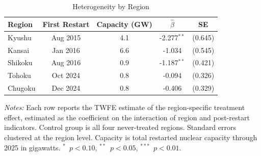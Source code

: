 \begin{table}[t]
\centering
\caption{Heterogeneity by Region}
\label{tab:hetero}
\begin{tabular}{lcccc}
\hline\hline
Region & First Restart & Capacity (GW) & $\hat{\beta}$ & SE \\
\hline
Kyushu & Aug 2015 & 4.1 & -2.277$^{**}$ & (0.645) \\
Kansai & Jan 2016 & 6.6 & -1.034 & (0.545) \\
Shikoku & Aug 2016 & 0.9 & -1.187$^{**}$ & (0.421) \\
Tohoku & Oct 2024 & 0.8 & -0.094 & (0.326) \\
Chugoku & Dec 2024 & 0.8 & -0.406 & (0.329) \\
\hline\hline
\end{tabular}
\begin{tablenotes}
\item \textit{Notes:} Each row reports the TWFE estimate of the region-specific treatment effect, estimated as the coefficient on the interaction of region and post-restart indicators. Control group is all four never-treated regions. Standard errors clustered at the region level. Capacity is total restarted nuclear capacity through 2025 in gigawatts. $^{*}$~$p<0.10$, $^{**}$~$p<0.05$, $^{***}$~$p<0.01$.
\end{tablenotes}
\end{table}

